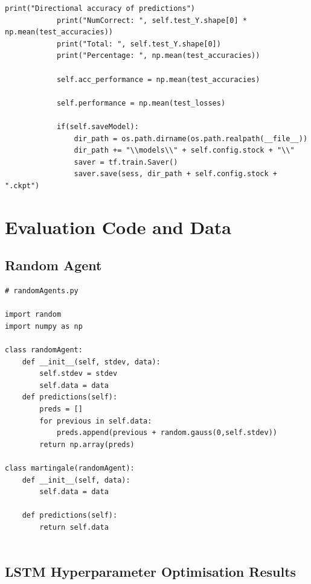 \documentclass[12pt,a4paper,twoside,openright]{report}
\begin{document}
\begin{lstlisting}[caption={A snippet of simplified \texttt{Python} code for the LSTM Network's main function},captionpos=b,label={lst:NB}]
            print("Directional accuracy of predictions")
            print("NumCorrect: ", self.test_Y.shape[0] * np.mean(test_accuracies))
            print("Total: ", self.test_Y.shape[0])
            print("Percentage: ", np.mean(test_accuracies))

            self.acc_performance = np.mean(test_accuracies)

            self.performance = np.mean(test_losses)

            if(self.saveModel):
                dir_path = os.path.dirname(os.path.realpath(__file__))
                dir_path += "\\models\\" + self.config.stock + "\\"
                saver = tf.train.Saver()
                saver.save(sess, dir_path + self.config.stock + ".ckpt")

\end{lstlisting}


\chapter{Evaluation Code and Data}

\section{Random Agent}
\label{appendix:Random}

\begin{lstlisting}[caption={The \texttt{Python} code for the random agent class, the martingale class},captionpos=b,label={lst:randomAgents}]
# randomAgents.py

import random
import numpy as np

class randomAgent:
    def __init__(self, stdev, data):
        self.stdev = stdev
        self.data = data
    def predictions(self):
        preds = []
        for previous in self.data:
            preds.append(previous + random.gauss(0,self.stdev))
        return np.array(preds)
		
class martingale(randomAgent):
    def __init__(self, data):
        self.data = data

    def predictions(self):
        return self.data
		
\end{lstlisting}

\section{LSTM Hyperparameter Optimisation Results}
\label{appendix:LSTMHyperRes}
\end{document}
